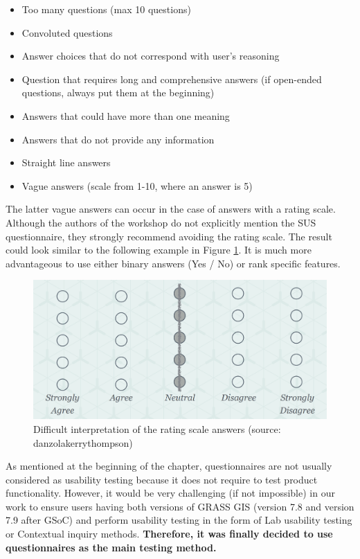 \documentclass[a4paper,10pt,twoside]{article}
\begin{document}
\begin{itemize}
\item Too many questions (max 10 questions)
\item Convoluted questions
\item Answer choices that do not correspond with user's reasoning
\item Question that requires long and comprehensive answers (if open-ended questions, always put them at the beginning)
\item Answers that could have more than one meaning
\item Answers that do not provide any information
\item Straight line answers
\item Vague answers (scale from 1-10, where an answer is 5)
\end{itemize}

\noindent The latter vague answers can occur in the case of answers
with a rating scale. Although the authors of the workshop do not
explicitly mention the SUS questionnaire, they strongly recommend
avoiding the rating scale. The result could look similar to the
following example in Figure \ref{fig:blur_scale}. It is much more
advantageous to use either binary answers (Yes / No) or rank specific
features.

\vspace{0.3cm}
\begin{figure}[hbt!] 
\begin{center}
\includegraphics[width=12.5cm]{../pictures/blur_scale.png} 
\caption[Difficult interpretation of the rating scale answers]{Difficult interpretation of the rating scale answers (source: danzolakerrythompson)}
\label{fig:blur_scale}
\end{center}
\end{figure}

\noindent As mentioned at the beginning of the chapter, questionnaires
are not usually considered as usability testing because it does not
require to test product functionality. However, it would be very
challenging (if not impossible) in our work to ensure users having
both versions of GRASS GIS (version 7.8 and version 7.9 after GSoC)
and perform usability testing in the form of Lab usability testing or
Contextual inquiry methods. \textbf{Therefore, it was finally decided
  to use questionnaires as the main testing method.}
\end{document}
